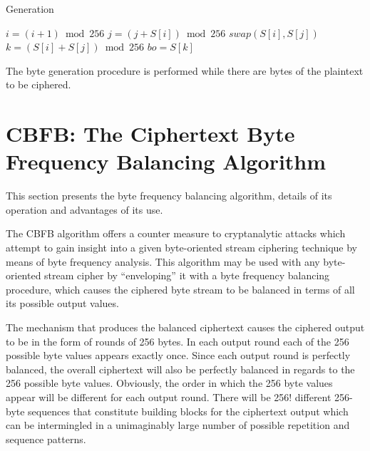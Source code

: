 \documentclass[conference]{IEEEtran}
\begin{document}
\begin{algorithm}
\caption{Generation}
\begin{algorithmic} 
\STATE $i = (i + 1) \bmod 256$ 
\STATE $j = (j + S[i]) \bmod 256$ 
\STATE $swap (S[i], S[j])$ 
\STATE $k = (S[i] + S[j]) \bmod 256$ 
\STATE $bo = S[k]$ 
\end{algorithmic}
\end{algorithm}

The byte generation procedure is performed while there are bytes of the plaintext to be ciphered.

\section{CBFB: The Ciphertext Byte Frequency Balancing Algorithm}

This section presents the byte frequency balancing algorithm, details of its operation and advantages of its use.

The CBFB algorithm offers a counter measure to cryptanalytic attacks which attempt to gain insight into a given byte-oriented stream ciphering technique by means of byte frequency analysis. This algorithm may be used with any byte-oriented stream cipher by “enveloping” it with a byte frequency balancing procedure, which causes the ciphered byte stream to be balanced in terms of all its  possible output values.

The mechanism that produces the balanced ciphertext causes the ciphered output to be in the form of rounds of 256 bytes. In each output round each of the 256 possible byte values appears exactly once.  Since each output round is perfectly balanced, the overall ciphertext will also be perfectly balanced in regards to the 256 possible byte values. Obviously, the order in which the 256 byte values appear will be different for each output round. There will be 256! different 256-byte sequences that constitute building blocks for the ciphertext output which can be intermingled in a unimaginably large number of possible repetition and sequence patterns.
\end{document}
